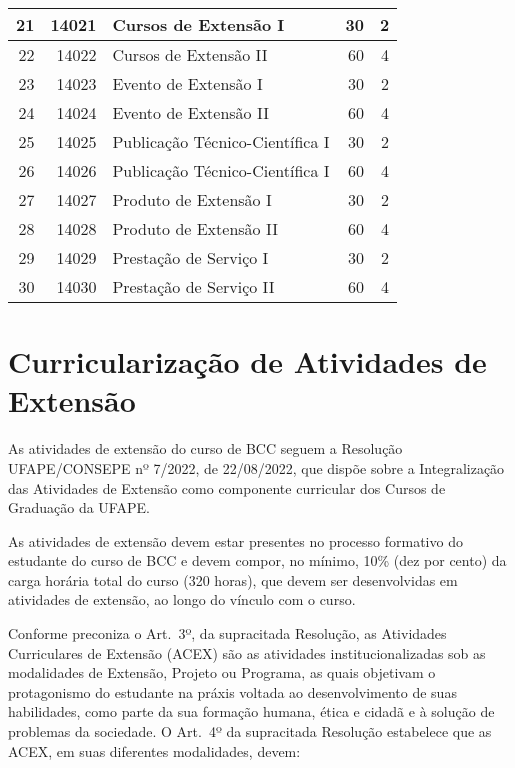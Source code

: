 \documentclass[
	12pt,				%
	openright,			%
  oneside,     %
	a4paper,			%
	english,			%
	french,				%
	spanish,			%
	brazil				%
	]{abntex2}
\begin{document}
\begin{longtable}{r|r|l|r|r}
    21    & 14021 & Cursos de Extensão I & 30    & 2 \\    \hline
    22    & 14022 & Cursos de Extensão II & 60    & 4 \\    \hline
    23    & 14023 & Evento de Extensão I & 30    & 2 \\    \hline
    24    & 14024 & Evento de Extensão II & 60    & 4 \\    \hline
    25    & 14025 & Publicação Técnico-Científica I & 30    & 2 \\    \hline
    26    & 14026 & Publicação Técnico-Científica I & 60    & 4 \\    \hline
    27    & 14027 & Produto de Extensão I & 30    & 2 \\    \hline
    28    & 14028 & Produto de Extensão II & 60    & 4 \\    \hline
    29    & 14029 & Prestação de Serviço I & 30    & 2 \\    \hline
    30    & 14030 & Prestação de Serviço II & 60    & 4 \\    \hline
    \end{longtable}%

    

%
%

\section{Curricularização de Atividades de Extensão}
\label{chap:curricularizacao-da-extensao}

As atividades de extensão do curso de BCC seguem a Resolução UFAPE/CONSEPE nº 7/2022, de 22/08/2022, que dispõe sobre a Integralização das Atividades de Extensão como componente curricular dos Cursos de Graduação da UFAPE.

As atividades de extensão devem estar presentes no processo formativo do estudante do curso de BCC e devem compor, no mínimo, 10\% (dez por cento) da carga horária total do curso (320 horas), que devem ser desenvolvidas em atividades de extensão, ao longo do vínculo com o curso.

Conforme preconiza o Art.~3º, da supracitada Resolução, as Atividades Curriculares de Extensão (ACEX) são as atividades institucionalizadas sob as modalidades de Extensão, Projeto ou Programa, as quais objetivam o protagonismo do estudante na práxis voltada ao desenvolvimento de suas habilidades, como parte da sua formação humana, ética e cidadã e à solução de problemas da sociedade. O Art.~4º da supracitada Resolução estabelece que as ACEX, em suas diferentes modalidades, devem:
\end{document}
